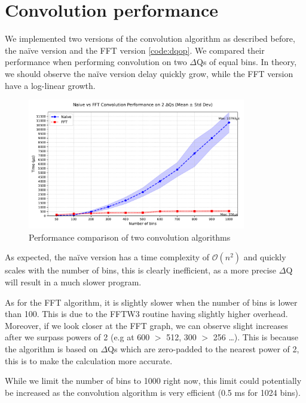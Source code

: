 \section{Convolution performance}
    We implemented two versions of the convolution algorithm as described before, the naïve version and the FFT version \ref{code:dqop}. We compared their performance when performing convolution on two $\Delta$Qs of equal bins. In theory, we should observe the naïve version delay quickly grow, while the FFT version have a log-linear growth.
    \begin{figure}[h]
        \begin{center}
            \includegraphics[width=0.85\textwidth]{img/conv_perf.pdf}
        \end{center}
        \caption{Performance comparison of two convolution algorithms}\label{fig:conv_perf}
    \end{figure}

    As expected, the naïve version has a time complexity of $\mathcal{O}(n^2)$ and quickly scales with the number of bins, this is clearly inefficient, as a more precise $\Delta$Q will result in a much slower program.

As for the FFT algorithm, it is slightly slower when the number of bins is lower than 100. This is due to the FFTW3 routine having slightly higher overhead. Moreover, if we look closer at the FFT graph, we can observe slight increases after we surpass powers of 2 (e.g at 600 $>$ 512, 300 $>$ 256 \dots). This is because the algorithm is based on $\Delta$Qs which are zero-padded to the nearest power of 2, this is to make the calculation more accurate.

While we limit the number of bins to 1000 right now, this limit could potentially be increased as the convolution algorithm is very efficient (0.5 ms for 1024 bins).
